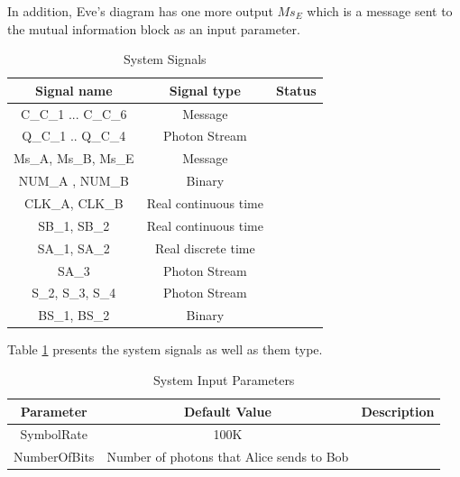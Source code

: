 In addition, Eve's diagram has one more output $Ms_{E}$ which is a message sent to the mutual information block as an input parameter.

\begin{table}[hbt]
\centering
\caption{System Signals}
\label{tb:signals}
\begin{tabular}{|c|c|c|}
\hline
\textbf{Signal name}         & \textbf{Signal type} & \textbf{Status} \\ \hline
C\_C\_1 ... C\_C\_6          & Message              &                 \\ \hline
Q\_C\_1 .. Q\_C\_4           & Photon Stream        &                 \\ \hline
Ms\_A, Ms\_B, Ms\_E          & Message              &                 \\ \hline
NUM\_A , NUM\_B              & Binary               &                 \\ \hline
CLK\_A, CLK\_B               & Real continuous time &                 \\ \hline
SB\_1, SB\_2                 & Real continuous time &                 \\ \hline
SA\_1, SA\_2                 & Real discrete time   &                 \\ \hline
SA\_3                        & Photon  Stream       &                 \\ \hline
S\_2, S\_3, S\_4             & Photon Stream        &                 \\ \hline
BS\_1, BS\_2                 & Binary               &                 \\ \hline
\end{tabular}
\end{table}

Table \ref{tb:signals} presents the system signals as well as them type.

\begin{table}[hbt]
\centering
\caption{System Input Parameters}
\label{tb:inputparameters}
\begin{tabular}{|c|c|c|}
\hline
\textbf{Parameter}           & \textbf{Default Value}                           & \textbf{Description} \\ \hline
SymbolRate                   & 100K                                             &                 \\ \hline
NumberOfBits                 & Number of photons that Alice sends to Bob        &                 \\ \hline

\end{tabular}
\end{table}

